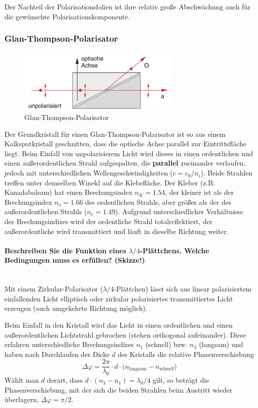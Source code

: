 \documentclass[a4paper, 11pt, ngerman, parskip=half-]{scrartcl}
\newcommand{\myparagraph}[1]{\paragraph{#1}\mbox{}\\}
\begin{document}
Der Nachteil der Polarisationsfolien ist ihre relativ große Abschwächung auch für die gewünschte Polarisationskomponente.
%
\subsubsection*{Glan-Thompson-Polarisator}
%
\begin{figure}[H]
    \centering
    \begin{samepage}
        \includegraphics[width=0.7\textwidth]{image/15/Glan-Thompson.jpg}
        \caption{Glan-Thompson-Polarisator}
        \label{fig:Glan-Thompson-Polarisator}
    \end{samepage}
\end{figure}
%
Der Grundkristall für einen Glan-Thompson-Polarisator ist so aus einem Kalkspatkristall geschnitten, dass die optische Achse parallel zur Eintrittsfläche liegt. Beim Einfall von unpolarisierem Licht wird dieses in einen ordentlichen und einen außerordentlichen Strahl aufgespalten, die \textbf{parallel} zueinander verlaufen, jedoch mit unterschiedlichen Wellengeschwindigkeiten ($c = c_0 / n_i$). Beide Strahlen treffen unter demselben Winekl auf die Klebefläche.
Der Kleber (z.B. Kanadabalsam) hat einen Brechungsindex $n_K = \num{1.54}$, der kleiner ist als der Brechungsindex $n_o = \num{1.66}$ des
ordentlichen Strahls, aber größer als der des außerordentlichen Strahls ($n_e = \num{1.49}$). Aufgrund unterschiedlicher Verhältnisse der Brechungsindizes wird der ordentliche Strahl totalreflektiert, der außerordentliche wird transmittiert und läuft in dieselbe Richtung weiter.


\myparagraph{Beschreiben Sie die Funktion eines $\lambda/4$-Plättchens. Welche Bedingungen muss es erfüllen? (Skizze!)}
%
Mit einem Zirkular-Polarisator ($\lambda/4$-Plättchen) lässt sich aus linear polarisiertem einfallenden Licht elliptisch oder zirkular polarisiertes transmittiertes Licht erzeugen (auch umgekehrte Richtung möglich).

Beim Einfall in den Kristall wird das Licht in einen ordentlichen und einen außerordentlichen Lichtstrahl gebrochen (stehen orthogonal aufeinander). Diese erfahren unterschiedliche Brechungsindizes $n_1$ (schnell) bzw. $n_3$ (langsam) und haben nach Durchlaufen der Dicke $d$ des Kristalls die relative Phasenverschiebung
%
\[\Delta \varphi = \frac{2\pi}{\lambda_0} \cdot d \cdot \bigg( n_{\text{langsam}} - n_{\text{schnell}} \bigg) \]
%
Wählt man $d$ derart, dass $d \cdot (n_3 - n_1) = \lambda_0/4$ gilt, so beträgt die Phasenverschiebung, mit der sich die beiden Strahlen beim Austritt wieder überlagern, $\Delta \varphi = \pi/2$.
\end{document}
